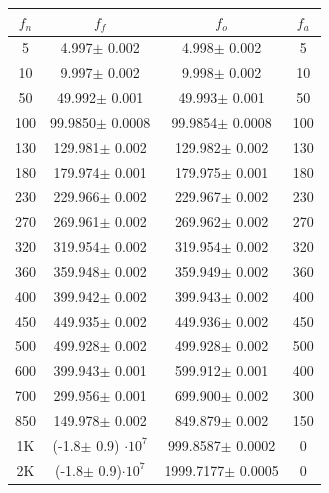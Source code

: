 \documentclass[journal]{IEEEtran}
\begin{document}
\vspace{4 mm}
\begin{left}
\begin{tabular}{c|c|c|c}
$f_n$  &  $f_f$ & $f_o$  &   $f_a $ \\ \hline
5    &      4.997$ \pm $ 0.002 &      4.998$ \pm $ 0.002 &    5 \\
10   &      9.997$ \pm $ 0.002 &      9.998$ \pm $ 0.002  &   10 \\
50   &     49.992$ \pm $ 0.001 &     49.993$ \pm $ 0.001  &   50 \\
100  &     99.9850$ \pm $ 0.0008 &     99.9854$ \pm $ 0.0008  &  100 \\
130  &    129.981$ \pm $ 0.002 &    129.982$ \pm $ 0.002  &  130 \\
180  &    179.974$ \pm $ 0.001 &    179.975$ \pm $ 0.001 &  180 \\
230  &    229.966$ \pm $ 0.002 &    229.967$ \pm $ 0.002  &  230 \\
270  &    269.961$ \pm $ 0.002 &    269.962$ \pm $ 0.002  &  270 \\
320  &    319.954$ \pm $ 0.002 &    319.954$ \pm $ 0.002  &  320 \\
360  &    359.948$ \pm $ 0.002 &    359.949$ \pm $ 0.002 &  360 \\
400  &    399.942$ \pm $ 0.002 &    399.943$ \pm $ 0.002  &  400 \\
450  &    449.935$ \pm $ 0.002 &    449.936$ \pm $ 0.002&  450 \\
500  &  499.928$ \pm $ 0.002 &  499.928$ \pm $ 0.002  &  500 \\
600  &    399.943$ \pm $ 0.001 &    599.912$ \pm $ 0.001    &  400 \\
700  &    299.956$ \pm $ 0.001 &    699.900$ \pm $ 0.002    &  300 \\
850  &    149.978$ \pm $ 0.002 &    849.879$ \pm $ 0.002    &  150 \\
1K &     (-1.8$ \pm $ 0.9) $\cdot 10^{7}$ &  999.8587$ \pm $ 0.0002  &    0 \\
2K &     (-1.8$ \pm $ 0.9)$\cdot 10^{7}$ &   1999.7177$ \pm $ 0.0005 & 0 \\
\end{tabular}
\end{left}
\vspace{3 mm}
\end{document}
